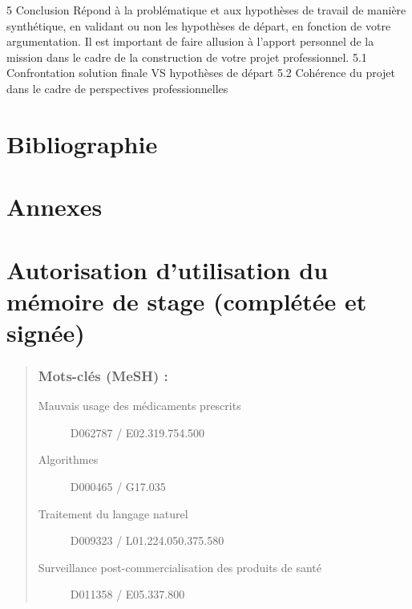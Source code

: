 \documentclass[a4paper, 11pt, openany, oneside, abstract=on]{report}
\begin{document}
5 Conclusion
Répond à la problématique et aux hypothèses de travail de manière synthétique, en validant ou non les hypothèses de départ, en fonction de votre argumentation.
Il est important de faire allusion à l'apport personnel de la mission dans le cadre de la construction de votre projet professionnel.
5.1 Confrontation solution finale VS hypothèses de départ
5.2 Cohérence du projet dans le cadre de perspectives professionnelles

\part*{Bibliographie}

\part*{Annexes}

\part*{Autorisation d'utilisation du mémoire de stage (complétée et signée)}

\addto{\captionsfrench}{\renewcommand{\abstractname}{Résumé}}
\begin{abstract}
    \section*{Mots-clés (MeSH) :}
    \begin{description}
    \item[Mauvais usage des médicaments prescrits] D062787 / E02.319.754.500\\
    \item[Algorithmes] D000465 / G17.035\\
    \item[Traitement du langage naturel] D009323 / L01.224.050.375.580\\
    \item[Surveillance post-commercialisation des produits de santé] D011358 / E05.337.800\\
    \end{description}
\end{abstract}
\end{document}
